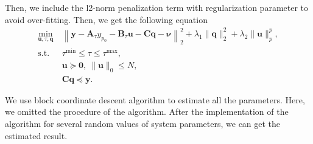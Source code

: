 \documentclass[]{article}
\begin{document}
Then, we include the l2-norm penalization term with regularization parameter to avoid over-fitting. Then, we get the following equation
\begin{subequations}
  \renewcommand{\theequation}
  {\theparentequation-\arabic{equation}}
  \begin{align}
  \min\limits_{\mathbf{u}, \tau, \mathbf{q}}~&\left\lVert \mathbf{y} - \mathbf{A}_\tau y_{p_0} - \mathbf{B}_\tau \mathbf{u} - \mathbf{C} \mathbf{q} - \boldsymbol{\nu} \right\lVert^2_2 + \lambda_1 \lVert \mathbf{q} \rVert_2^2 + \lambda_2 \lVert \mathbf{u} \rVert_p^p, \\
  \mathrm{s.t.}~& \tau^{\mathrm{min}} \leqslant \tau \leqslant \tau^{\mathrm{max}}, \\
  & \mathbf{u} \succcurlyeq \mathbf{0},~ \lVert \mathbf{u} \rVert_0 \leqslant N, \\
  & \mathbf{C}\mathbf{q} \preccurlyeq \mathbf{y}.
  \end{align}
\end{subequations}

 We use block coordinate descent algorithm to estimate all the parameters. Here, we omitted the procedure of the algorithm. After the implementation of the algorithm for several random values of system parameters, we can get the estimated result.
\end{document}
